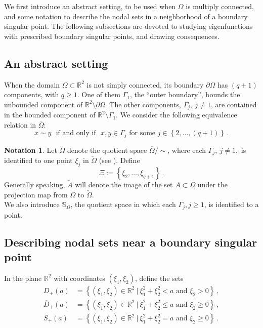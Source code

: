 \documentclass[12pt,a4paper]{amsart}
\theoremstyle{plain} %
\theoremstyle{definition}
\newtheorem{notation}[theorem]{Notation}
\numberwithin{equation}{section}
\numberwithin{figure}{section}
\numberwithin{table}{section}
\newcommand{\R}{\mathbb{R}}
\newcommand{\bS}{\mathbb{S}}
\newcommand{\wb}[1]{\overline{#1}}
\newcommand{\sm}{\!\setminus\!}
\newcommand{\set}[1]{\left\lbrace #1 \right\rbrace}
\begin{document}
{We first introduce an abstract setting,  to be used when $\Omega$ is multiply connected, and some notation to describe the nodal sets in a neighborhood of a boundary singular point. The following  subsections are devoted to studying eigenfunctions with prescribed boundary singular points, and drawing consequences.


\subsection{An abstract setting}\label{SS-hmn2-10}

When the domain $\Omega \subset \R^2$ is not simply connected, its boundary $\partial \Omega$ has  $(q+1)$ components, with $q\geq 1$.  One of them $\Gamma_1$, the ``outer boundary'', bounds the unbounded component of $\R^2\sm \partial \Omega$. The other components, $\Gamma_j, ~j\neq 1$, are contained in the bounded component of $\R^2\sm \Gamma_1$. We consider the following equivalence relation in $\wb{\Omega}$:
%
\begin{equation}\label{E-hmn210-equiv}
x \sim y \text{~~if and only if~~} x, y \in \Gamma_j
\text{~for some~} j \in \set{2,\ldots,(q+1)}\,.
\end{equation}


\begin{notation}\label{N-hmn210-2}
Let $\check{\Omega}$ denote the quotient space $\wb{\Omega}/\!\!\sim$, where each $\Gamma_j, ~j\neq 1,$ is identified to one point $\xi_j$ in $\check{\Omega}$ (see \cite{Bona2009}). Define
$$\Xi := \set{\xi_2,\ldots,\xi_{q+1}}\,.$$
Generally speaking, $\check{A}$ will denote the image of the set $A \subset \wb{\Omega}$ under the projection map from $\wb{\Omega}$ to $\check{\Omega}$.\\
We also introduce $\bS_{\Omega}$, the quotient space in which each $\Gamma_j, j\ge 1$, is identified to a point.
\end{notation}%



\subsection{Describing nodal sets near a boundary singular point}\label{SS-hmn2-20}

In the plane $\R^2$ with coordinates $(\xi_1,\xi_2)$, define the sets
%
\begin{equation}\label{E-hmn-21b4}
\begin{array}{ll}
D_{+}(a) &= \set{(\xi_1,\xi_2) \in \R^2 ~|~ \xi_1^2 + \xi_2^2 < a \text{~and~} \xi_2 > 0}\,,\\[5pt]
\wb{D}_{+}(a) &= \set{(\xi_1,\xi_2) \in \R^2 ~|~ \xi_1^2 + \xi_2^2 \le a \text{~and~} \xi_2 \ge 0}\,,\\[5pt]
S_{+}(a) &= \set{(\xi_1,\xi_2) \in \R^2 ~|~ \xi_1^2 + \xi_2^2 = a \text{~and~} \xi_2 \ge 0}\,.
\end{array}%
\end{equation}


}
\end{document}
